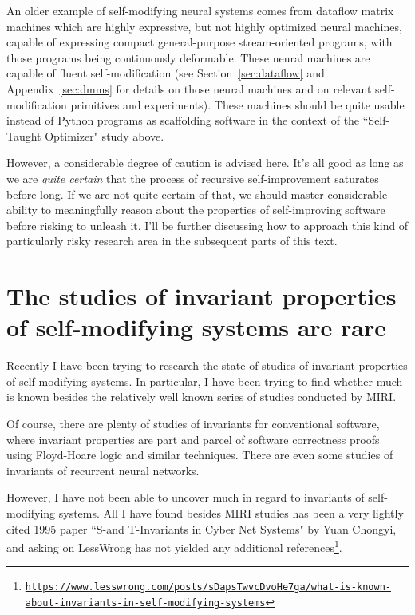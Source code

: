 \documentclass{article}
\begin{document}
An older example of self-modifying neural systems comes from dataflow matrix machines which are highly expressive,
but not highly optimized neural machines, capable of expressing compact general-purpose stream-oriented programs,
with those programs being continuously deformable. These neural machines are capable of fluent self-modification (see Section~\ref{sec:dataflow} and Appendix~\ref{sec:dmms} for details
on those neural machines and on relevant self-modification primitives and experiments). These machines should be quite usable
instead of Python programs as scaffolding software in the context of the ``Self-Taught Optimizer" study above.

However, a considerable degree of caution is advised here. It's all good as long as we are {\em quite certain} that the process of
recursive self-improvement saturates before long. If we are not quite certain of that, we should master considerable ability to
meaningfully reason about the properties of self-improving software before risking to unleash it. I'll be further discussing
how to approach this kind of particularly risky research area in the subsequent parts of this text.

\section{The studies of invariant properties of self-modifying systems are rare}\label{sec:known}

Recently I have been trying to research the state of studies of invariant properties of self-modifying systems.
In particular, I have been trying to find whether much is known besides the relatively well known series of studies conducted by MIRI.

Of course, there are plenty of studies of invariants for conventional software, where invariant properties
are part and parcel of software correctness proofs using Floyd-Hoare logic and similar techniques.
There are even some studies of invariants of recurrent neural networks. 

However, I have not been able to uncover much in regard to invariants of self-modifying systems.
All I have found besides MIRI studies has been a very lightly cited 1995 paper ``S-and T-Invariants in Cyber Net Systems"
by Yuan Chongyi, and asking on LessWrong has not yielded any additional
references\footnote{\href{https://www.lesswrong.com/posts/sDapsTwvcDvoHe7ga/what-is-known-about-invariants-in-self-modifying-systems}
{\tt https://www.lesswrong.com/posts/sDapsTwvcDvoHe7ga/what-is-known-about-invariants-in-self-modifying-systems}}.
\end{document}

